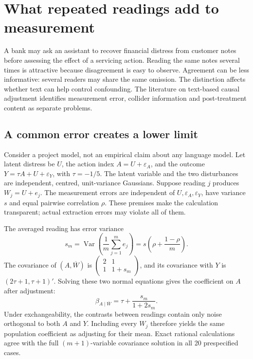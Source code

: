 \section{What repeated readings add to measurement}
\label{gap29:measurement}

A bank may ask an assistant to recover financial distress from customer
notes before assessing the effect of a servicing action. Reading the same
notes several times is attractive because disagreement is easy to observe.
Agreement can be less informative: several readers may share the same
omission. The distinction affects whether text can help control confounding.
The literature on text-based causal adjustment identifies measurement error,
collider information and post-treatment content as separate problems.
\citep{exec13_census_text_review_arxiv}

\subsection{A common error creates a lower limit}
Consider a project model, not an empirical claim about any language model.
Let latent distress be $U$, the action index $A=U+\varepsilon_A$, and
the outcome $Y=\tau A+U+\varepsilon_Y$, with $\tau=-1/5$. The latent
variable and the two disturbances are independent, centred, unit-variance
Gaussians. Suppose reading $j$ produces $W_j=U+e_j$. The measurement errors
are independent of $U,\varepsilon_A,\varepsilon_Y$, have variance $s$ and
equal pairwise correlation $\rho$. These premises make the calculation
transparent; actual extraction errors may violate all of them.

The averaged reading has error variance
\[
 s_m=\operatorname{Var}\!\left(\frac{1}{m}\sum_{j=1}^m e_j\right)
     =s\left(\rho+\frac{1-\rho}{m}\right).
\]
The covariance of $(A,\overline W)$ is
$\left(\begin{smallmatrix}2&1\\1&1+s_m\end{smallmatrix}\right)$,
and its covariance with $Y$ is $(2\tau+1,\tau+1)'$. Solving these two
normal equations gives the coefficient on $A$ after adjustment:
\[
 \beta_{A\mid\overline W}=\tau+\frac{s_m}{1+2s_m}.
\]
Under exchangeability, the contrasts between readings contain only noise
orthogonal to both $A$ and $Y$. Including every $W_j$ therefore yields the
same population coefficient as adjusting for their mean. Exact rational
calculations agree with the full $(m+1)$-variable covariance solution in all
20 prespecified cases.

